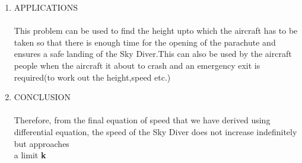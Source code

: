 \documentclass[14pt]{article}
\begin{document}
\begin{enumerate}
\[{}
\]
\vspace{0.2cm}
\[
\textcolor{blue!80!white}
{
\mathbf
 {\quad \quad \; \;\; =\frac{1}{2k}\ln\left(\frac{v-k}{v+k}\right)}
}
\]
Substituting in $\,$ \textcolor{brown}{[2]} \\
\[
\textcolor{blue!80!white}
{
\mathbf
  {\therefore \: {\frac{1}{2k} \ln\left(\frac{v-k}{v+k}\right)} \:= \: -\frac{b}{m}t+c\quad \quad \quad \quad \quad \: }
}
\]
\vspace{0.3cm}
\[
\textcolor{blue!80!white}
{
\mathbf 
 { \therefore \ln\left(\frac{v-k}{v+k}\right)\:=\: (2k)\left(-\frac{b}{m}t\right)+c(2k) \quad \; \; }
}
\]
\vspace{0.2cm}
\[
\textcolor{blue!80!white}
{
\mathbf 
 { \therefore c_1e^{-pt}=\dfrac{v-k}{v+k} \quad \quad \quad \quad \quad \quad \quad \quad \quad \quad \quad  }
}
\] \\
,where
\[
\textcolor{black!80!white}
{
\mathbf 
 {  \; p=\dfrac{2kb}{m} \: and \: c_1=e^{2kc} }
}
\]
\vspace{0.2cm}
\[
\textcolor{blue!80!white}
{
\mathbf 
 {  \therefore (v-k)=(v+k)e^{-pt} \quad \quad \quad \quad \quad \quad \quad \:   }
}
\]
\[
\textcolor{blue!80!white}
{
\mathbf 
 {  \therefore (v-k)=vc_1e^{-pt}+kc_1e^{-pt} \quad \quad \quad \quad \quad  }
}
\]
\vspace{0.1cm}
\[
\textcolor{blue!80!white}
{
\mathbf 
 {  \therefore v-vc_1e^{-pt}=kc_1e^{-pt}+k \quad \quad \quad \quad \quad \; \; }
}
\]
\vspace{0.1cm}
\[
\textcolor{blue!80!white}
{
\mathbf 
 {  \therefore v(1-c_1e^{-pt})=k(1+c_1e^{-pt})\quad \quad \quad \; \; \; \: }
}
\]
\vspace{0.1cm}
\[
\textcolor{blue!80!white}
{
\mathbf 
 {  \therefore \textcolor{red!80!white}{v(t)=k\dfrac{(1+c_1e^{-pt})}{(1-c_1e^{-pt})}}\quad \quad \quad \quad \quad \quad \quad \quad }
}
\] \\

This is the required equation for the speed of the Sky Diver at any time $t$ after opening the parachute. \\
\Huge\item{\textcolor{blue!80!white}{APPLICATIONS}} \\
\\
\huge This problem can be used to find the height upto which the aircraft has to be taken so that there is enough time for the opening of the parachute and ensures a safe landing of the Sky Diver.This can also be used by the aircraft people when the aircraft it about to crash and an emergency exit is required(to work out the height,speed etc.)  \\
\newpage
\Huge\item{\textcolor{blue!80!white}{CONCLUSION}} \\
\\ \huge Therefore, from the final equation of speed that we have derived using differential equation, the speed of the Sky Diver does not increase indefinitely but approaches \\ a limit   \bf k
\end{enumerate}


\end{document}
